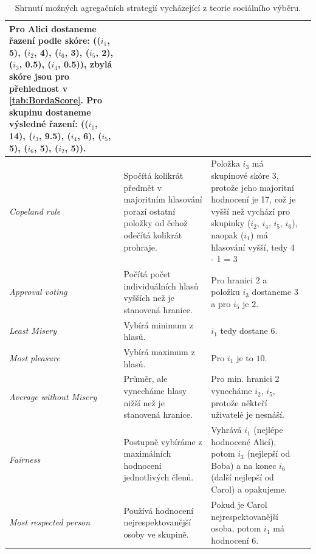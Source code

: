 \documentclass[12pt,a4paper]{report}
\begin{document}
\begin{table}[b!]
\begin{tabular}{| p{3cm} | p{5cm} | p{5cm} | p{5cm} |}
    Pro Alici dostaneme řazení podle skóre:
    (($i_1$, 5), ($i_2$, 4), ($i_6$, 3), ($i_5$, 2), ($i_3$, 0.5), ($i_4$, 0.5)),
    zbylá skóre jsou pro přehlednost v \ref{tab:BordaScore}.
    Pro skupinu dostaneme výsledné řazení: (($i_1$, 14), ($i_3$, 9.5), ($i_4$, 6), ($i_5$, 5), ($i_6$, 5), ($i_2$, 5)).\\
    \midrule \textit{Copeland rule} &
    Spočítá kolikrát předmět v majoritním hlasování porazí
    ostatní položky od čehož odečítá kolikrát prohraje.
    & Položka $i_3$ má skupinové skóre 3,
    protože jeho majoritní hodnocení je 17,
    což je vyšší než vychází pro skupinky
    ($i_2$, $i_4$, $i_5$, $i_6$), naopak ($i_1$) má hlasování vyšší, tedy 4 - 1 = 3 \\
    \midrule \textit{Approval voting} & Počítá počet individuálních hlasů vyšších než je stanovená hranice. & Pro hranici $2$ a položku $i_3$ dostaneme $3$ a pro $i_5$ je $2$.\\
    \midrule \textit{Least Misery} & Vybírá minimum z hlasů. & $i_1$ tedy dostane $6$.  \\
    \midrule \textit{Most pleasure} & Vybírá maximum z hlasů. & Pro $i_1$ je to $10$.  \\
    \midrule \textit{Average without Misery} & Průměr, ale vynecháme hlasy nižší než je stanovená hranice. &
    Pro min. hranici 2 vynecháme $i_2$, $i_5$, protože někteří uživatelé je nesnáší. \\
    \midrule \textit{Fairness} & Postupně vybíráme z maximálních hodnocení jednotlivých členů. &
    Vyhrává $i_1$ (nejlépe hodnocené Alicí), potom $i_3$ (nejlepší od Boba) a na konec
    $i_6$ (další nejlepší od Carol) a opakujeme.  \\
    \midrule
    \textit{Most respected person} & Používá hodnocení nejrespektovanější osoby ve skupině. &
    Pokud je Carol nejrespektovanější osoba, potom $i_1$ má hodnocení 6.\\
    \midrule
    \bottomrule
    \end{tabular}

    \caption{Shrnutí možných agregačních strategií vycházející z teorie sociálního výběru.}
    \label{tab:AllBasicStrategies}
\end{table}
\end{document}
